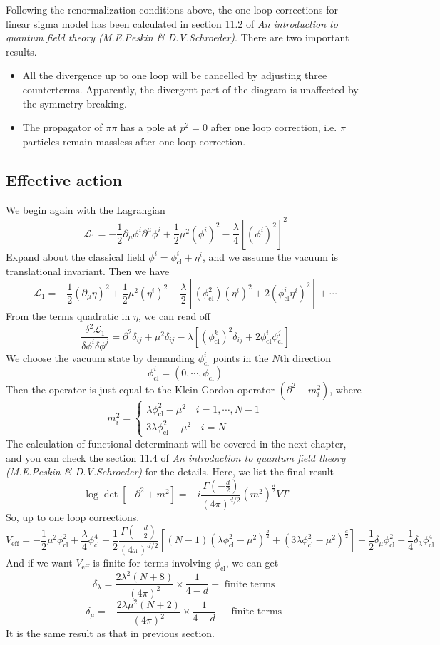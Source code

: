 \documentclass[cyan]{elegantnote}
\begin{document}
\noindent
Following the renormalization conditions above, the one-loop corrections for linear sigma model has been calculated in section 11.2 of \emph{An introduction to quantum field theory (M.E.Peskin \& D.V.Schroeder)}. There are two important results.
\begin{itemize}
\item All the divergence up to one loop will be cancelled by adjusting three counterterms. Apparently, the divergent part of the diagram is unaffected by the symmetry breaking.
\item The propagator of $\pi\pi$ has a pole at $p^2 = 0$ after one loop correction, i.e. $\pi$ particles remain massless after one loop correction.
\end{itemize}

\subsection{Effective action}
We begin again with the Lagrangian
\[\mathcal{L}_1 = -\frac{1}{2} \partial_{\mu} \phi^i \partial^{\mu}\phi^i + \frac{1}{2} \mu^2 (\phi^i)^2 - \frac{\lambda}{4} [(\phi^i)^2]^2\]
Expand about the classical field $\phi^i = \phi_{\mathrm{cl}}^i + \eta^i$, and we assume the vacuum is translational invariant. Then we have
\[\mathcal{L}_1 = -\frac{1}{2}(\partial_{\mu}\eta)^2 + \frac{1}{2}\mu^2(\eta^i)^2 - \frac{\lambda}{2}[(\phi_{\mathrm{cl}}^2)(\eta^i)^2+ 2(\phi_{\mathrm{cl}}^i\eta^i)^2] + \cdots\]
From the terms quadratic in $\eta$, we can read off
\[\frac{\delta^2 \mathcal{L}_1}{\delta\phi^i\delta\phi^j} = \partial^2\delta_{ij} + \mu^2\delta_{ij} - \lambda[(\phi_{\mathrm{cl}}^k)^2\delta_{ij} + 2\phi_{\mathrm{cl}}^i \phi_{\mathrm{cl}}^j]\]
We choose the vacuum state by demanding $\phi_{\mathrm{cl}}^i$ points in the $N$th direction
\[\phi_{\mathrm{cl}}^i = (0,\cdots,\phi_{\mathrm{cl}})\]
Then the operator is just equal to the Klein-Gordon operator $(\partial^2-m_i^2)$, where
\[m_i^2 = \begin{cases} \lambda\phi_{\mathrm{cl}}^2-\mu^2 \quad i=1,\cdots,N-1 \\ 3\lambda\phi_{\mathrm{cl}}^2-\mu^2 \quad i=N \end{cases}\]
The calculation of functional determinant will be covered in the next chapter, and you can check the section 11.4 of \emph{An introduction to quantum field theory (M.E.Peskin \& D.V.Schroeder)} for the details. Here, we list the final result
\[\log\det [-\partial^2 + m^2] = -i\frac{\Gamma(-\frac{d}{2})}{(4\pi)^{d/2}}(m^2)^{\frac{d}{2}}VT\]
So, up to one loop corrections.
\[V_{\mathrm{eff}} = -\frac{1}{2} \mu^2 \phi_{\mathrm{cl}}^2 + \frac{\lambda}{4} \phi_{\mathrm{cl}}^4 - \frac{1}{2}\frac{\Gamma(-\frac{d}{2})}{(4\pi)^{d/2}}[(N-1)(\lambda\phi_{\mathrm{cl}}^2-\mu^2)^{\frac{d}{2}} + (3\lambda\phi_{\mathrm{cl}}^2-\mu^2)^{\frac{d}{2}}] + \frac{1}{2}\delta_{\mu}\phi_{\mathrm{cl}}^2 + \frac{1}{4}\delta_{\lambda}\phi_{\mathrm{cl}}^4\]
And if we want $V_{\mathrm{eff}}$ is finite for terms involving $\phi_{\mathrm{cl}}$, we can get
\[\delta_{\lambda} = \frac{2\lambda^2(N+8)}{(4\pi)^2} \times \frac{1}{4-d} + \mbox{ finite terms }\]
\[\delta_{\mu} = -\frac{2\lambda\mu^2(N+2)}{(4\pi)^2} \times \frac{1}{4-d} + \mbox{ finite terms }\]
It is the same result as that in previous section.
\end{document}
